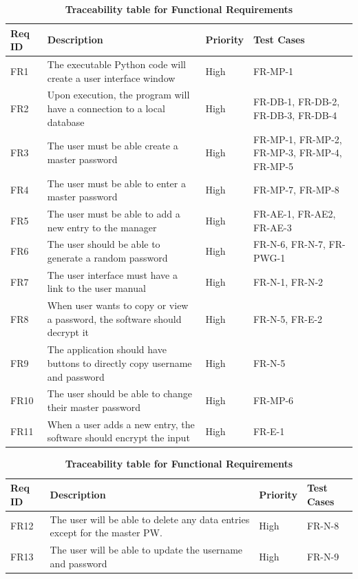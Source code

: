 \documentclass[12pt, titlepage]{article}
\begin{document}
\begin{table}[!htbp]
    \caption{\textbf{Traceability table for Functional Requirements}} \label{Table}
    \begin{tabularx}{\textwidth}{p{2cm}Xp{2cm}X}
        \toprule
        \textbf{Req ID} & \textbf{Description} & \textbf{Priority} & \textbf{Test Cases}\\
        \midrule
        FR1  & The executable Python code will create a user interface window & High & FR-MP-1\\\hline
        FR2  & Upon execution, the program will have a connection to a local database & High & FR-DB-1, FR-DB-2, FR-DB-3, FR-DB-4\\\hline
        FR3  & The user must be able create a master password & High & FR-MP-1, FR-MP-2, FR-MP-3, FR-MP-4, FR-MP-5\\\hline
        FR4  & The user must be able to enter a master password & High & FR-MP-7, FR-MP-8\\\hline
        FR5  & The user must be able to add a new entry to the manager & High & FR-AE-1, FR-AE2, FR-AE-3\\\hline
        FR6  & The user should be able to generate a random password  & High & FR-N-6, FR-N-7, FR-PWG-1\\\hline
        FR7  & The user interface must have a link to the user manual & High & FR-N-1, FR-N-2\\\hline
        FR8  & When user wants to copy or view a password, the software should decrypt it & High & FR-N-5, FR-E-2\\\hline
        FR9  & The application should have buttons to directly copy username and password & High & FR-N-5\\\hline
        FR10 & The user should be able to change their master password  & High & FR-MP-6\\\hline
        FR11 & When a user adds a new entry, the software should encrypt the input & High & FR-E-1\\
    
        \bottomrule
    \end{tabularx}
\end{table}

\begin{table}[!htbp]
    \caption{\textbf{Traceability table for Functional Requirements}} \label{5Table}
    \begin{tabularx}{\textwidth}{p{2cm}Xp{2cm}X}
        \toprule
        \textbf{Req ID} & \textbf{Description} & \textbf{Priority} & \textbf{Test Cases}\\
        \midrule
        FR12 & The user will be able to delete any data entries except for the master PW.} & High & FR-N-8\\\hline
        FR13 & The user will be able to update the username and password & High & FR-N-9\\
    
        \bottomrule
    \end{tabularx}
\end{table}
\end{document}
